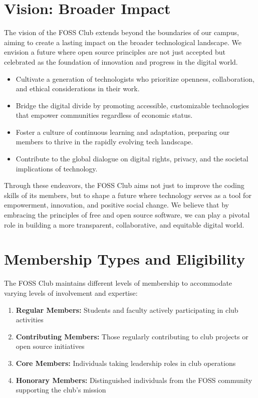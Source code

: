 \documentclass[12pt,a4paper]{article}
\begin{document}
\section{Vision: Broader Impact}

The vision of the FOSS Club extends beyond the boundaries of our campus, aiming to create a lasting impact on the broader technological landscape. We envision a future where open source principles are not just accepted but celebrated as the foundation of innovation and progress in the digital world.

\begin{itemize}
    \item Cultivate a generation of technologists who prioritize openness, collaboration, and ethical considerations in their work.
    \item Bridge the digital divide by promoting accessible, customizable technologies that empower communities regardless of economic status.
    \item Foster a culture of continuous learning and adaptation, preparing our members to thrive in the rapidly evolving tech landscape.
    \item Contribute to the global dialogue on digital rights, privacy, and the societal implications of technology.
\end{itemize}

Through these endeavors, the FOSS Club aims not just to improve the coding skills of its members, but to shape a future where technology serves as a tool for empowerment, innovation, and positive social change. We believe that by embracing the principles of free and open source software, we can play a pivotal role in building a more transparent, collaborative, and equitable digital world.

\section{Membership Types and Eligibility}

The FOSS Club maintains different levels of membership to accommodate varying levels of involvement and expertise:

\begin{enumerate}
    \item \textbf{Regular Members:} Students and faculty actively participating in club activities
    \item \textbf{Contributing Members:} Those regularly contributing to club projects or open source initiatives
    \item \textbf{Core Members:} Individuals taking leadership roles in club operations
    \item \textbf{Honorary Members:} Distinguished individuals from the FOSS community supporting the club's mission
\end{enumerate}
\end{document}
